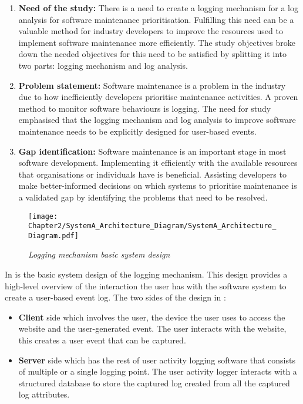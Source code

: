 \begin{enumerate}[label=\textbf{\Roman*.}]
	\item \textbf{Need of the study:} There is a need to create a logging mechanism for a log analysis for software maintenance prioritisation. Fulfilling this need can be a valuable method for industry developers to improve the resources used to implement software maintenance more efficiently. The study objectives broke down the needed objectives for this need to be satisfied by splitting it into two parts: logging mechanism and log analysis. 
	\item \textbf{Problem statement:} Software maintenance is a problem in the industry due to how inefficiently developers prioritise maintenance activities. A proven method to monitor software behaviours is logging. The need for study emphasised that the logging mechanism and log analysis to improve software maintenance needs to be explicitly designed for user-based events.
	\item \textbf{Gap identification:} Software maintenance is an important stage in most software development. Implementing it efficiently with the available resources that organisations or individuals have is beneficial. Assisting developers to make better-informed decisions on which systems to prioritise maintenance is a validated gap by identifying the problems that need to be resolved.
\end{enumerate}



\begin{figure}[!htb]
	\centering %
	\texttt{[image: Chapter2/SystemA\_Architecture\_Diagram/SystemA\_Architecture\_Diagram.pdf]}
	\caption[Logging mechanism basic system design]
	{\textit{Logging mechanism basic system design}}\label{fig:ch2_systemDesign}
\end{figure}

In  is the basic system design of the logging mechanism. This design provides a high-level overview of the interaction the user has with the software system to create a user-based event log. The two sides of the design in :

\begin{itemize}
	\item \textbf{Client} side which involves the user, the device the user uses to access the website and the user-generated event. The user interacts with the website, this creates a user event that can be captured. 
	\item \textbf{Server} side which has the rest of user activity logging software that consists of multiple or a single logging point. The user activity logger interacts with a structured database to store the captured log created from all the captured log attributes.
\end{itemize}